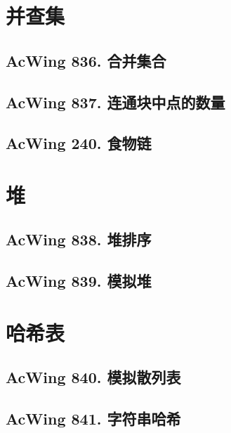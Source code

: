 \section{并查集}
\subsection{AcWing 836. 合并集合}
\subsection{AcWing 837. 连通块中点的数量}
\subsection{AcWing 240. 食物链}

\section{堆}
\subsection{AcWing 838. 堆排序}
\subsection{AcWing 839. 模拟堆}

\section{哈希表}
\subsection{AcWing 840. 模拟散列表}
\subsection{AcWing 841. 字符串哈希}